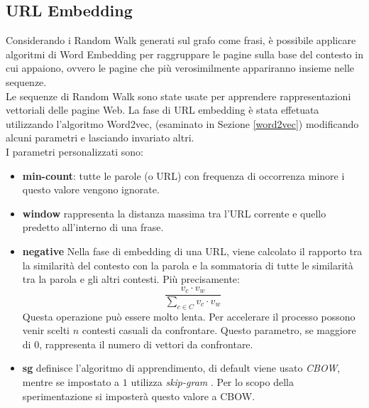 \subsection{URL Embedding}
Considerando i Random Walk generati sul grafo come frasi, è possibile applicare algoritmi di Word Embedding per raggruppare le pagine sulla base del contesto in cui appaiono, ovvero le pagine che più verosimilmente appariranno insieme nelle sequenze.
\\
Le sequenze di Random Walk sono state usate per apprendere rappresentazioni vettoriali delle pagine Web. La fase di URL embedding è stata effetuata utilizzando l'algoritmo Word2vec, \cite{gensim} (esaminato in Sezione \ref{word2vec}) modificando alcuni parametri e lasciando invariato altri.
\\

I parametri personalizzati sono:
\begin{itemize}
\item \textbf{min-count}: tutte le parole (o URL) con frequenza di occorrenza minore i questo valore vengono ignorate.
\item \textbf{window} rappresenta la distanza massima tra l'URL corrente e quello predetto all'interno di una frase.
\item \textbf{negative} Nella fase di embedding di una URL, viene calcolato il rapporto tra la similarità del contesto con la parola e la sommatoria di tutte le similarità tra la parola e gli altri contesti. Più precisamente:
\begin{equation}
\frac{v_c \cdot v_w}{\sum\limits_{c \in C} v_c \cdot v_w}
\end{equation}
Questa operazione può essere molto lenta. Per accelerare il processo possono venir scelti $n$ contesti casuali da confrontare. Questo parametro, se maggiore di $0$, rappresenta il numero di vettori da confrontare.
\item \textbf{sg} definisce l'algoritmo di apprendimento, di default viene usato \textit{CBOW}, mentre se impostato a $1$ utilizza \textit{skip-gram} \cite{Mikolov13}. Per lo scopo della sperimentazione si imposterà questo valore a  CBOW.
\end{itemize}


